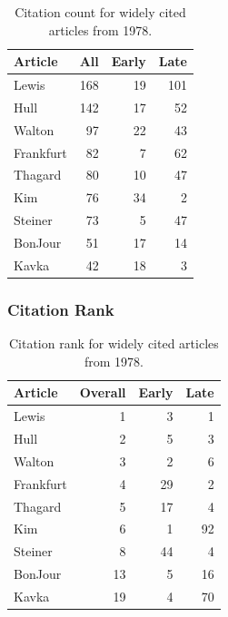 \documentclass[
  10pt,
  letterpaper,
  DIV=11,
  numbers=noendperiod,
  twoside]{scrartcl}
\begin{document}
\begin{longtable}[]{@{}lrrr@{}}

\caption{\label{tbl-citation-count-1978}Citation count for widely cited
articles from 1978.}

\tabularnewline

\toprule\noalign{}
Article & All & Early & Late \\
\midrule\noalign{}
\endhead
\bottomrule\noalign{}
\endlastfoot
Lewis & 168 & 19 & 101 \\
Hull & 142 & 17 & 52 \\
Walton & 97 & 22 & 43 \\
Frankfurt & 82 & 7 & 62 \\
Thagard & 80 & 10 & 47 \\
Kim & 76 & 34 & 2 \\
Steiner & 73 & 5 & 47 \\
BonJour & 51 & 17 & 14 \\
Kavka & 42 & 18 & 3 \\

\end{longtable}

\subsubsection*{Citation Rank}\label{sec-rank-1978}

\begin{longtable}[]{@{}lrrr@{}}

\caption{\label{tbl-citation-rank-1978}Citation rank for widely cited
articles from 1978.}

\tabularnewline

\toprule\noalign{}
Article & Overall & Early & Late \\
\midrule\noalign{}
\endhead
\bottomrule\noalign{}
\endlastfoot
Lewis & 1 & 3 & 1 \\
Hull & 2 & 5 & 3 \\
Walton & 3 & 2 & 6 \\
Frankfurt & 4 & 29 & 2 \\
Thagard & 5 & 17 & 4 \\
Kim & 6 & 1 & 92 \\
Steiner & 8 & 44 & 4 \\
BonJour & 13 & 5 & 16 \\
Kavka & 19 & 4 & 70 \\

\end{longtable}
\end{document}

